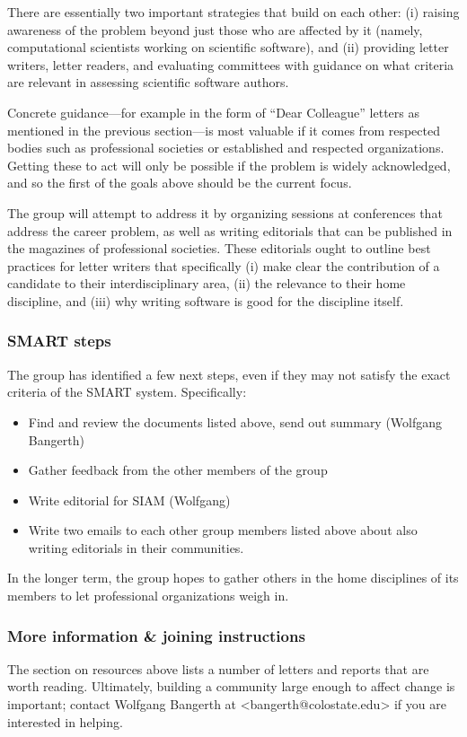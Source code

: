 There are essentially two important strategies that build on each
other: (i) raising awareness of the problem beyond just those who are
affected by it (namely, computational scientists working on scientific
software), and (ii) providing letter writers, letter readers, and
evaluating committees with guidance on what criteria are relevant in
assessing scientific software authors.

Concrete guidance---for example in the form of ``Dear Colleague''
letters as mentioned in the previous section---is most valuable if it
comes from respected bodies such as professional societies or
established and respected organizations. Getting these to act
will only be possible if the problem is widely acknowledged, and so
the first of the goals above should be the current focus.

The group will attempt to address it by organizing sessions at conferences
that address the career problem, as well as writing editorials that
can be published in the magazines of professional societies. These
editorials ought to outline best practices for letter writers that
specifically (i) make clear the contribution of a candidate to their
interdisciplinary area, (ii) the relevance to their home discipline, and
(iii) why writing software is good for the discipline itself.


\subsubsection{SMART steps}

The group has identified a few next steps, even if they may not satisfy the
exact criteria of the SMART system. Specifically:
\begin{itemize}
  \item Find and review the documents listed above, send out summary
    (Wolfgang Bangerth)
  \item Gather feedback from the other members of the group
  \item Write editorial for SIAM (Wolfgang)
  \item Write two emails to each other group members listed above about
    also writing editorials in their communities.
\end{itemize}
In the longer term, the group hopes to gather others in the home disciplines of its members to
let professional organizations weigh in.


\subsubsection{More information \& joining instructions}

The section on resources above lists a number of letters and reports
that are worth reading. Ultimately, building a community large enough
to affect change is important; contact Wolfgang Bangerth at
<bangerth@colostate.edu> if you are interested in helping.
